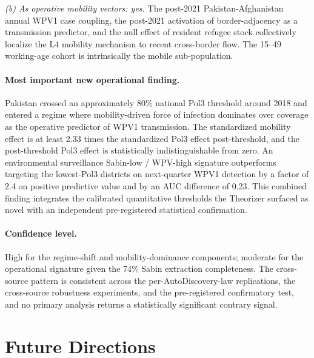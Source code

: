 \documentclass[11pt]{article}
\begin{document}
\emph{(b) As operative mobility vectors: yes.} The post-2021 Pakistan-Afghanistan annual WPV1 case coupling, the post-2021 activation of border-adjacency as a transmission predictor, and the null effect of resident refugee stock collectively localize the L4 mobility mechanism to recent cross-border flow. The 15--49 working-age cohort is intrinsically the mobile sub-population.

\paragraph{Most important new operational finding.} Pakistan crossed an approximately 80\% national Pol3 threshold around 2018 and entered a regime where mobility-driven force of infection dominates over coverage as the operative predictor of WPV1 transmission. The standardized mobility effect is at least 2.33 times the standardized Pol3 effect post-threshold, and the post-threshold Pol3 effect is statistically indistinguishable from zero. An environmental surveillance Sabin-low / WPV-high signature outperforms targeting the lowest-Pol3 districts on next-quarter WPV1 detection by a factor of 2.4 on positive predictive value and by an AUC difference of 0.23. This combined finding integrates the calibrated quantitative thresholds the Theorizer surfaced as novel with an independent pre-registered statistical confirmation.

\paragraph{Confidence level.} High for the regime-shift and mobility-dominance components; moderate for the operational signature given the 74\% Sabin extraction completeness. The cross-source pattern is consistent across the per-AutoDiscovery-law replications, the cross-source robustness experiments, and the pre-registered confirmatory test, and no primary analysis returns a statistically significant contrary signal.

\section{Future Directions}
\end{document}
